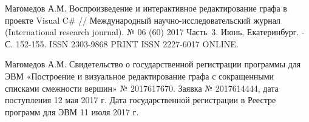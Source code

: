 \begin{thebibliography}{1}
Магомедов А.М. Воспроизведение и интерактивное редактирование графа в проекте Visual C\# //
Международный научно-исследовательский журнал (International research journal). № 06 (60) 2017 Часть~3. Июнь, Екатеринбург. - С. 152-155. ISSN 2303-9868 PRINT ISSN 2227-6017 ONLINE.


Магомедов А.М. Свидетельство о государственной регистрации программы для ЭВМ «Построение и
визуальное редактирование графа с сокращенными списками смежности вершин» № 2017617670. Заявка № 2017614444, дата
поступления 12 мая 2017 г. Дата государственной регистрации в Реестре программ для ЭВМ 11 июля 2017 г.




\end{thebibliography}
